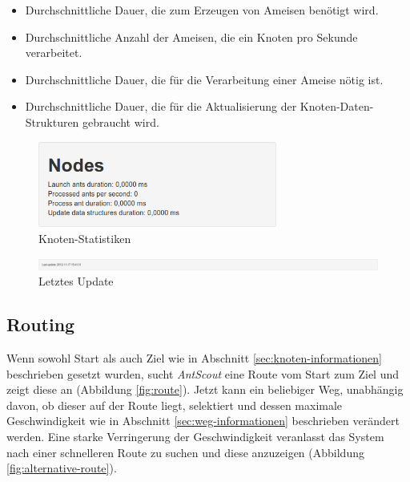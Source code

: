 \begin{itemize}
  \item Durchschnittliche Dauer, die zum Erzeugen von Ameisen benötigt wird.
  \item Durchschnittliche Anzahl der Ameisen, die ein Knoten pro Sekunde verarbeitet.
  \item Durchschnittliche Dauer, die für die Verarbeitung einer Ameise nötig ist.
  \item Durchschnittliche Dauer, die für die Aktualisierung der Knoten-Daten-Strukturen gebraucht wird.
\end{itemize}

\begin{figure}[htbp]
  \centering
  \includegraphics[width=0.7\textwidth]{Bilder/Knoten-Statistiken.png}
  \caption{Knoten-Statistiken}
  \label{fig:knoten-statistiken}
\end{figure}

\begin{figure}[htbp]
  \centering
  \includegraphics[width=\textwidth]{Bilder/Letztes-Update.png}
  \caption{Letztes Update}
  \label{fig:letztes-update}
\end{figure}

\subsection{Routing}
\label{sec:routing}

Wenn sowohl Start als auch Ziel wie in Abschnitt \ref{sec:knoten-informationen} beschrieben gesetzt wurden, sucht \textit{AntScout} eine Route vom Start zum Ziel und zeigt diese an (Abbildung \ref{fig:route}).
Jetzt kann ein beliebiger Weg, unabhängig davon, ob dieser auf der Route liegt, selektiert und dessen maximale Geschwindigkeit wie in Abschnitt \ref{sec:weg-informationen} beschrieben verändert werden.
Eine starke Verringerung der Geschwindigkeit veranlasst das System nach einer schnelleren Route zu suchen und diese anzuzeigen (Abbildung \ref{fig:alternative-route}).

